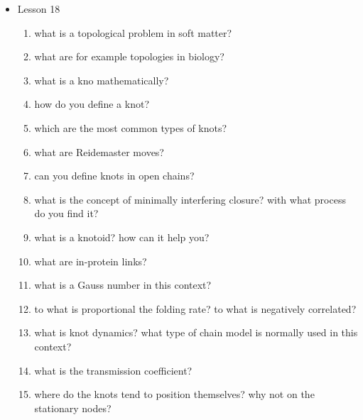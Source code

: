 {\begin{itemize}
\begin{enumerate}
        \item what is a kreatky-porog model?
        \item what is the persistance length? and the kuhn length?
        \item what are self-avoiding chains? how can you describe the average difference in volume?
        \item what is the kremer-grest model?
        \item how can you evaluate the stiffness of a polymer?
        \item main characteristics of DNA
        \item what is oxDNA
        \item what are the resolutions types used on the base of the length wanted
        \item what is a crumpled globule model?
    \end{enumerate}
    \item Lesson 18
    \begin{enumerate}
        \item what is a topological problem in soft matter?
        \item what are for example topologies in biology?
        \item what is a kno mathematically?
        \item how do you define a knot?
        \item which are the most common types of knots?
        \item what are Reidemaster moves?
        \item can you define knots in open chains?
        \item what is the concept of minimally interfering closure? with what process do you find it?
        \item what is a knotoid? how can it help you?
        \item what are in-protein links?
        \item what is a Gauss number in this context?
        \item to what is proportional the folding rate? to what is negatively correlated?
        \item what is knot dynamics? what type of chain model is normally used in this context?
        \item what is the transmission coefficient?
        \item where do the knots tend to position themselves? why not on the stationary nodes? 

\end{enumerate}
\end{itemize}}
